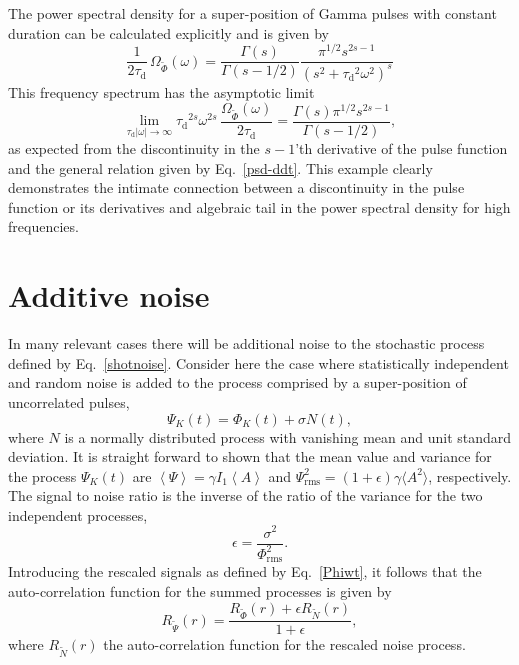 \documentclass[aps,prb,12pt,a4paper,preprint,amsmath,amssymb,groupedaddress]{revtex4-1}
\newcommand{\ave}[1]{{\left<#1\right>}}
\newcommand{\abs}[1]{{\left|#1\right|}}\newcommand{\order}[1]{{\mathcal{O}\left(#1\right)}}
\newcommand{\taud}{\ensuremath{\tau_\text{d}}}
\newcommand{\Phirms}{\ensuremath{\Phi}_\text{rms}}
\newcommand{\Phiwt}{\ensuremath{\widetilde{\Phi}}}
\newcommand{\Psiave}{\ensuremath{\ave{\Psi}}}
\newcommand{\Psirms}{\ensuremath{\Psi}_\text{rms}}
\newcommand{\Psiwt}{\ensuremath{\widetilde{\Psi}}}
\newcommand{\Nwt}{\ensuremath{\widetilde{N}}}
\newcommand{\Aave}{\ensuremath{\ave{A}}}
\newcommand{\Eqref}[1]{Eq.~\eqref{#1}}
\begin{document}
The power spectral density for a super-position of Gamma pulses with constant duration can be calculated explicitly and is given by
\begin{equation}
\frac{1}{2\taud}\,\Omega_{\Phiwt}(\omega) = \frac{\Gamma(s)}{\Gamma(s-1/2)} \frac{\pi^{1/2}s^{2s-1}}{(s^2+\taud^2\omega^2)^s}
\end{equation}
This frequency spectrum has the asymptotic limit
\begin{equation}
\lim_{\taud\abs{\omega}\rightarrow\infty} \taud^{2s}\omega^{2s}\,\frac{\Omega_{\Phiwt}(\omega)}{2\taud} = \frac{\Gamma(s)\pi^{1/2}s^{2s-1}}{\Gamma(s-1/2)} ,
\end{equation}
as expected from the discontinuity in the $s-1$'th derivative of the pulse function and the general relation given by \Eqref{psd-ddt}. This example clearly demonstrates the intimate connection between a discontinuity in the pulse function or its derivatives and algebraic tail in the power spectral density for high frequencies.



\section{Additive noise}\label{sec:noise}

 

In many relevant cases there will be additional noise to the stochastic process defined by \Eqref{shotnoise}. Consider here the case where statistically independent and random noise is added to the process comprised by a super-position of uncorrelated pulses,\cite{garcia-nme,theodorsen-ps}
\begin{equation}
\Psi_K(t) = \Phi_K(t) + \sigma N(t) ,
\end{equation}
where $N$ is a normally distributed process with vanishing mean and unit standard deviation. It is straight forward to shown that the mean value and variance for the process $\Psi_K(t)$ are $\Psiave=\gamma I_1\Aave$ and $\Psirms^2=(1+\epsilon)\gamma\langle{A^2}\rangle$, respectively. The signal to noise ratio is the inverse of the ratio of the variance for the two independent processes,
\begin{equation}
\epsilon = \frac{\sigma^2}{\Phirms^2} .
\end{equation}
%
Introducing the rescaled signals as defined by \Eqref{Phiwt}, it follows that the auto-correlation function for the summed processes is given by
\begin{equation}
R_{\Psiwt}(r) = \frac{ R_{\Phiwt}(r) + \epsilon R_{\Nwt}(r) }{1+\epsilon} ,
\end{equation}
where $R_{\Nwt}(r)$ the auto-correlation function for the rescaled noise process.
\end{document}
